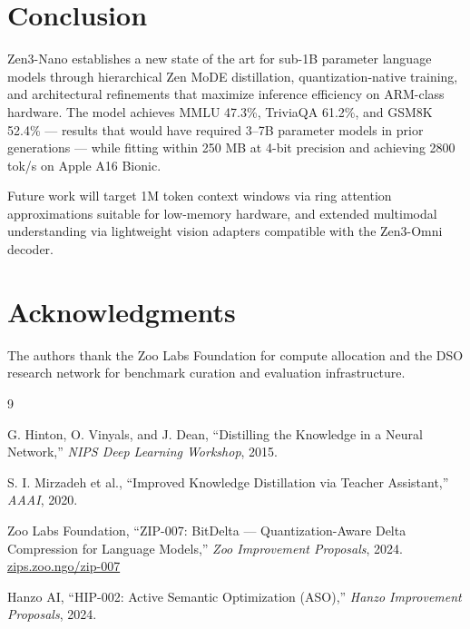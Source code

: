 \documentclass[11pt,a4paper]{article}
\begin{document}
\section{Conclusion}
\label{sec:conclusion}

Zen3-Nano establishes a new state of the art for sub-1B parameter language models
through hierarchical Zen MoDE distillation, quantization-native training, and
architectural refinements that maximize inference efficiency on ARM-class hardware.
The model achieves MMLU 47.3\%, TriviaQA 61.2\%, and GSM8K 52.4\% --- results
that would have required 3--7B parameter models in prior generations --- while
fitting within 250 MB at 4-bit precision and achieving 2800 tok/s on Apple A16
Bionic.

Future work will target 1M token context windows via ring attention approximations
suitable for low-memory hardware, and extended multimodal understanding via
lightweight vision adapters compatible with the Zen3-Omni decoder.

\section*{Acknowledgments}

The authors thank the Zoo Labs Foundation for compute allocation and the DSO
research network for benchmark curation and evaluation infrastructure.


\begin{thebibliography}{9}

G. Hinton, O. Vinyals, and J. Dean,
``Distilling the Knowledge in a Neural Network,''
\textit{NIPS Deep Learning Workshop}, 2015.

S. I. Mirzadeh et al.,
``Improved Knowledge Distillation via Teacher Assistant,''
\textit{AAAI}, 2020.

Zoo Labs Foundation,
``ZIP-007: BitDelta --- Quantization-Aware Delta Compression for Language Models,''
\textit{Zoo Improvement Proposals}, 2024.
\href{https://zips.zoo.ngo/zip-007}{zips.zoo.ngo/zip-007}

Hanzo AI,
``HIP-002: Active Semantic Optimization (ASO),''
\textit{Hanzo Improvement Proposals}, 2024.

\end{thebibliography}
\end{document}
